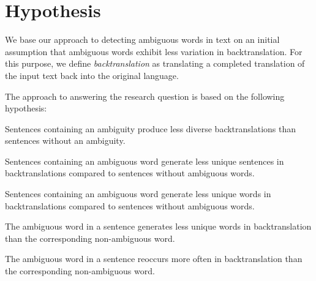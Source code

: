 \section{Hypothesis}
\label{sec:Methodology:Hypothesis}
We base our approach to detecting ambiguous words in text on an initial assumption that ambiguous words exhibit less variation in backtranslation.  For this purpose, we define \textit{backtranslation} as translating a completed translation of the input text back into the original language.  

The approach to answering the research question is based on the following hypothesis:

\begin{hyp}[H]\label{main}
Sentences containing an ambiguity produce less diverse backtranslations than sentences without an ambiguity.
\end{hyp}



\begin{subhyp}[a]\label{a}
Sentences containing an ambiguous word generate less unique sentences in backtranslations compared to sentences without ambiguous words.
\end{subhyp}

\begin{subhyp}[b]\label{b}
Sentences containing an ambiguous word generate less unique words in backtranslations compared to sentences without ambiguous words.
\end{subhyp}

\begin{subhyp}[c]\label{c}
The ambiguous word in a sentence generates less unique words in backtranslation than the corresponding non-ambiguous word.
\end{subhyp}

\begin{subhyp}[d]\label{d}
The ambiguous word in a sentence reoccurs more often in backtranslation than the corresponding non-ambiguous word.
\end{subhyp}



